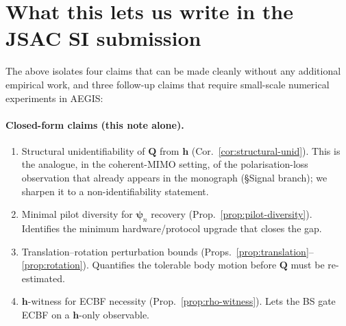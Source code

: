\documentclass[11pt,a4paper]{article}
\theoremstyle{definition}
\newcommand{\hh}{\mathbf{h}}
\newcommand{\Q}{\mathbf{Q}}
\newcommand{\psib}{\boldsymbol{\psi}}
\begin{document}
\section{What this lets us write in the JSAC SI submission}
\label{sec:writeup}

The above isolates four claims that can be made cleanly without any
additional empirical work, and three follow-up claims that require
small-scale numerical experiments in AEGIS:

\paragraph{Closed-form claims (this note alone).}
\begin{enumerate}[leftmargin=2em,itemsep=2pt]
\item Structural unidentifiability of $\Q$ from $\hh$
      (Cor.~\ref{cor:structural-unid}). This is the analogue, in the
      coherent-MIMO setting, of the polarisation-loss observation that
      already appears in the monograph (\S Signal branch); we sharpen it
      to a non-identifiability statement.
\item Minimal pilot diversity for $\psib_n$ recovery
      (Prop.~\ref{prop:pilot-diversity}). Identifies the minimum
      hardware/protocol upgrade that closes the gap.
\item Translation--rotation perturbation bounds
      (Props.~\ref{prop:translation}--\ref{prop:rotation}). Quantifies the
      tolerable body motion before $\Q$ must be re-estimated.
\item $\hh$-witness for ECBF necessity (Prop.~\ref{prop:rho-witness}).
      Lets the BS gate ECBF on a $\hh$-only observable.
\end{enumerate}
\end{document}
